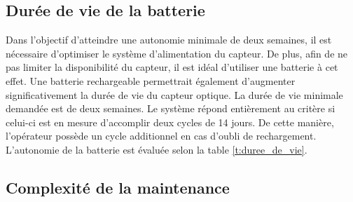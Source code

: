 \subsection{Durée de vie de la batterie}

\begin{table}
   \footnotesize
   \centering
   \caption{Évaluation de la durée de vie de la batterie}
   \label{t:duree_de_vie}
\end{table}

Dans l'objectif d'atteindre une autonomie minimale de deux semaines, il est nécessaire d'optimiser le système d'alimentation du capteur. De plus, afin de ne pas limiter la disponibilité du capteur, il est idéal d'utiliser une batterie à cet effet. Une batterie rechargeable permettrait également d'augmenter significativement la durée de vie du capteur optique. La durée de vie minimale demandée est de deux semaines. Le système répond entièrement au critère si celui-ci est en mesure d'accomplir deux cycles de 14 jours. De cette manière, l'opérateur possède un cycle additionnel en cas d'oubli de rechargement. L'autonomie de la batterie est évaluée selon la table \ref{t:duree_de_vie}.

\subsection{Complexité de la maintenance}

